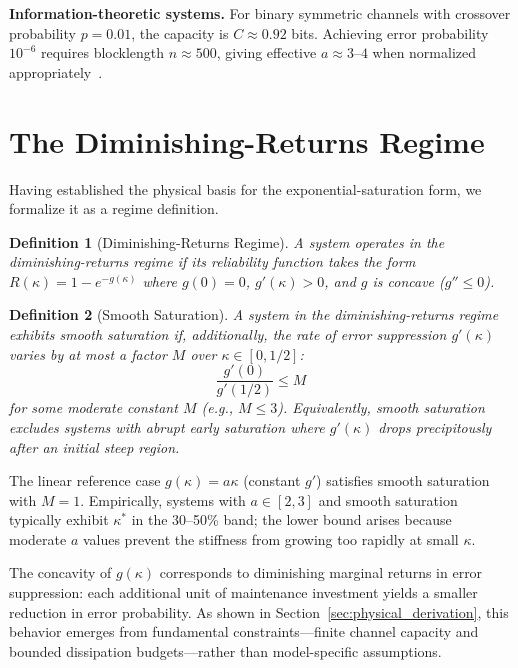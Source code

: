 \documentclass[11pt,twocolumn]{article}
\newtheorem{definition}{Definition}
\begin{document}
\textbf{Information-theoretic systems.} For binary symmetric channels with crossover probability $p = 0.01$, the capacity is $C \approx 0.92$ bits. Achieving error probability $10^{-6}$ requires blocklength $n \approx 500$, giving effective $a \approx 3$--$4$ when normalized appropriately~\cite{Polyanskiy2010}.

\section{The Diminishing-Returns Regime}

Having established the physical basis for the exponential-saturation form, we formalize it as a regime definition.

\begin{definition}[Diminishing-Returns Regime]
A system operates in the diminishing-returns regime if its reliability function takes the form $R(\kappa) = 1 - e^{-g(\kappa)}$ where $g(0) = 0$, $g'(\kappa) > 0$, and $g$ is concave ($g'' \le 0$).
\end{definition}

\begin{definition}[Smooth Saturation]
A system in the diminishing-returns regime exhibits \emph{smooth saturation} if, additionally, the rate of error suppression $g'(\kappa)$ varies by at most a factor $M$ over $\kappa \in [0, 1/2]$:
\begin{equation}
\frac{g'(0)}{g'(1/2)} \leq M
\end{equation}
for some moderate constant $M$ (e.g., $M \leq 3$). Equivalently, smooth saturation excludes systems with abrupt early saturation where $g'(\kappa)$ drops precipitously after an initial steep region.
\end{definition}

The linear reference case $g(\kappa) = a\kappa$ (constant $g'$) satisfies smooth saturation with $M = 1$. Empirically, systems with $a \in [2, 3]$ and smooth saturation typically exhibit $\kappa^*$ in the 30--50\% band; the lower bound arises because moderate $a$ values prevent the stiffness from growing too rapidly at small $\kappa$.

The concavity of $g(\kappa)$ corresponds to diminishing marginal returns in error suppression: each additional unit of maintenance investment yields a smaller reduction in error probability. As shown in Section~\ref{sec:physical_derivation}, this behavior emerges from fundamental constraints---finite channel capacity and bounded dissipation budgets---rather than model-specific assumptions.
\end{document}
